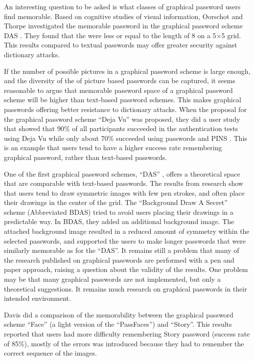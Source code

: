   An interesting question to be asked is what classes of graphical password users find memorable. Based on cognitive studies of visual information, Oorschot and Thorpe \cite{Thorpe1} investigated the memorable password in the graphical password scheme DAS \cite{Jermyn}. They found that the were less or equal to the length of 8 on a 5$\times$5 grid. This results compared to textual passwords may offer greater security against dictionary attacks.

  If the number of possible pictures in a graphical password scheme is large enough, and the diversity of the of picture based passwords can be captured, it seems reasonable to argue that memorable password space of a graphical password scheme will be higher than text-based password schemes. This makes graphical passwords offering better resistance to dictionary attacks. When the proposal for the graphical password scheme ``Deja Vu'' was proposed, they did a user study that showed that 90\% of all participants succeeded in the authentication tests using Deja Vu while only about 70\% succeeded using passwords and PINS \cite{DejaVu}. This is an example that users tend to have a higher success rate remembering graphical password, rather than text-based passwords.

  One of the first graphical password schemes, ``DAS'' \cite{Jermyn}, offers a theoretical space that are comparable with text-based passwords. The results from research show that users tend to draw symmetric images with few pen strokes, and often place their drawings in the center of the grid. The ``Background Draw A Secret'' scheme (Abbreviated BDAS) \cite{BDAS} tried to avoid users placing their drawings in a predictable way. In BDAS, they added an additional background image. The attached background image resulted in a reduced amount of symmetry within the selected passwords, and supported the users to make longer passwords that were similarly memorable as for the ``DAS''. It remains still a problem that many of the research published on graphical passwords are performed with a pen and paper approach, raising a question about the validity of the results. One problem may be that many graphical passwords are not implemented, but only a theoretical suggestions. It remains much research on graphical passwords in their intended environment.

  Davis \cite{Davis} did a comparison of the memorability between the graphical password scheme ``Face'' (a light version of the ``PassFaces'') and ``Story''. This results reported that users had more difficulty remembering Story password (success rate of 85\%), mostly of the errors was introduced because they had to remember the correct sequence of the images.

